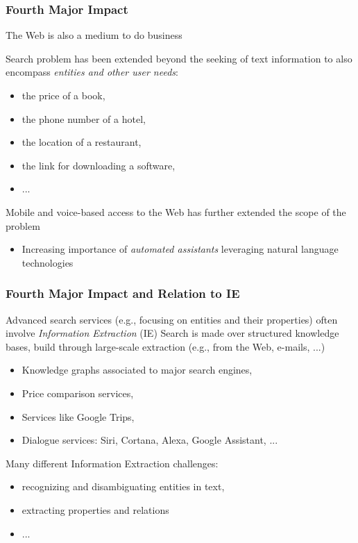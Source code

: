 \documentclass[svgnames]{beamer}
\begin{document}
\begin{frame}
  \frametitle{Fourth Major Impact}

The Web is also a medium to do business
\vfill

Search problem has been extended beyond the seeking of text information to also encompass \emph{entities and other user needs}:
\begin{itemize}
  \item the price of a book, 
  \item the phone number of a hotel,
  \item the location of a restaurant,
  \item the link for downloading a software,
  \item ...
\end{itemize}
\vfill
Mobile and voice-based access to the Web has further extended the scope of the problem
\begin{itemize}
\item Increasing importance of \emph{automated assistants} leveraging natural language technologies
\end{itemize}
\end{frame}

\begin{frame}
\frametitle{Fourth Major Impact and Relation to IE}
Advanced search services (e.g., focusing on entities and their properties) often involve \emph{Information Extraction} (IE)
\vfill
Search is made over structured knowledge bases, build through large-scale extraction (e.g., from the Web, e-mails, ...)
\begin{itemize}
\item Knowledge graphs associated to major search engines,
\item Price comparison services,
\item Services like Google Trips,
\item Dialogue services: Siri, Cortana, Alexa, Google Assistant, ...
\end{itemize}
\vfill
Many different Information Extraction challenges:
\begin{itemize}
 \item recognizing and disambiguating entities in text,
 \item extracting properties and relations
 \item ...
\end{itemize}
\end{frame}
\end{document}
